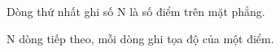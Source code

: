 Dòng thứ nhất ghi số N là số điểm trên mặt phẳng.  

   N dòng tiếp theo, mỗi dòng ghi tọa độ của một điểm.